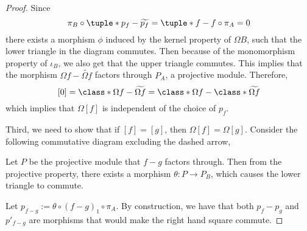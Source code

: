 \begin{proof}
    Since
    \[
        \pi_B \circ \tuple*{p_f - \widetilde{p_f}} = \tuple*{f - f} \circ \pi_A = 0
    \]
    there exists a morphism \( \phi \) induced by the kernel property of \( \Omega B \), such that the lower triangle in the diagram commutes. Then because of the monomorphism property of \( \iota_B \), we also get that the upper triangle commutes. This implies that the morphism \( \Omega f - \widetilde{\Omega f} \) factors through \( P_A \), a projective module. Therefore,
    \[
        [0] = \class*{\Omega f - \widetilde{\Omega f}} = \class*{\Omega f} - \class*{\widetilde{\Omega f}}
    \]
    which implies that \( \Omega [f] \) is independent of the choice of \( p_f \).

    Third, we need to show that if \( [f] = [g] \), then \( \Omega [f] = \Omega [g] \). Consider the following commutative diagram excluding the dashed arrow,
    \begin{center}
    \end{center}

    Let \( P \) be the projective module that \( f - g \) factors through. Then from the projective property, there exists a morphism \( \theta: P \to P_B \), which causes the lower triangle to commute.

    Let \( p_{f - g} := \theta \circ (f - g)_1 \circ \pi_A \). By construction, we have that both \( p_f - p_g \) and \( p'_{f - g} \) are morphisms that would make the right hand square commute.
    

\end{proof}
